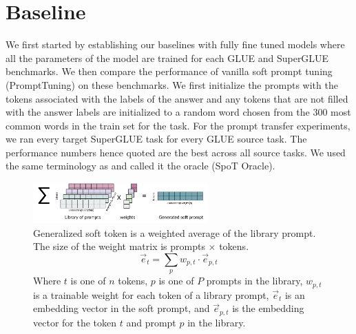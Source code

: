 \documentclass[final,6p,times,twocolumn,authoryear]{elsarticle}
\begin{document}
\section{Baseline}
We first started by establishing our baselines with fully fine tuned models where all the parameters of the model are trained for each GLUE and SuperGLUE benchmarks.  We then compare the performance of vanilla soft prompt tuning (PromptTuning) \citep{lester_2021} on these benchmarks. We first initialize the prompts with the tokens associated with the labels of the answer and any tokens that are not filled with the answer labels are initialized to a random word chosen from the 300 most common words in the train set for the task. For the prompt transfer experiments, we ran every target SuperGLUE task for every GLUE source task. The performance numbers hence quoted are the best across all source tasks. We used the same terminology as \cite{vu_2022} and called it the oracle (SpoT Oracle).

\begin{figure}[t]
\centering
\includegraphics[width=0.6\textwidth]{library_prompts_cross_weights.png}
\caption{Generalized soft token is a weighted average of the library prompt. The size of the weight matrix is prompts $\times$ tokens. 
$$\overrightarrow{e}_t=\sum_p w_{p,t} \cdot \overrightarrow{e}_{p,t}$$ Where $t$ is one of $n$ tokens, $p$ is one of $P$ prompts in the library, $w_{p,t}$ is a trainable weight for each token of a library prompt, $\overrightarrow{e}_t$ is an embedding vector in the soft prompt, and $\overrightarrow{e}_{p,t}$ is the embedding vector for the token $t$ and prompt $p$ in the library.}
\label{library_prompts_cross_weights}
\end{figure}
\end{document}
